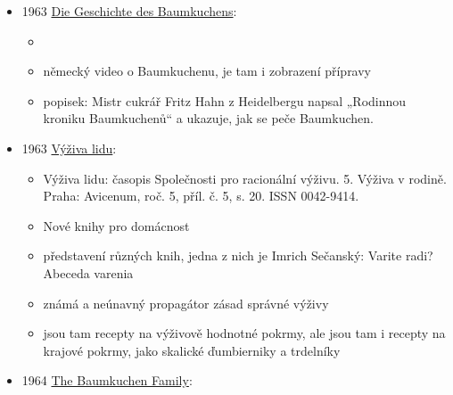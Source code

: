\begin{itemize}
  \begin{itemize}
  \tightlist
  \item
    není online, mají v
    \href{https://www.knihovny.cz/Record/nkp.SLK01-000511327?sid=30934569}{NK}
  \item
    s. 191:

    \begin{itemize}
    \tightlist
    \item
      jen zmínka, že v bohatých selských rodinách připravovala matka pro
      děti cukroví, například trdelníky s anýzem, opékané na ohništi
    \end{itemize}
  \item
    s. 192:

    \begin{itemize}
    \tightlist
    \item
      připrava trdelníků je známá jen na západě Drahanský vysočiny
    \end{itemize}
  \end{itemize}
\item
  1963
  \href{https://www.ardmediathek.de/video/swr-retro-abendschau/die-geschichte-des-baumkuchens/swr/Y3JpZDovL3N3ci5kZS9hZXgvbzExNzY4MDA}{Die
  Geschichte des Baumkuchens}:

  \begin{itemize}
  \tightlist
  \item
  \item
    německý video o Baumkuchenu, je tam i zobrazení přípravy
  \item
    popisek: Mistr cukrář Fritz Hahn z Heidelbergu napsal „Rodinnou
    kroniku Baumkuchenů`` a ukazuje, jak se peče Baumkuchen.
  \end{itemize}
\item
  1963
  \href{https://ceskadigitalniknihovna.cz/uuid/uuid:ef7b0f21-c9bf-11ee-8a98-005056825209}{Výživa
  lidu}:

  \begin{itemize}
  \tightlist
  \item
    Výživa lidu: časopis Společnosti pro racionální výživu. 5. Výživa v
    rodině. Praha: Avicenum, roč. 5, příl. č. 5, s. 20. ISSN 0042-9414.
  \item
    Nové knihy pro domácnost
  \item
    představení různých knih, jedna z nich je Imrich Sečanský: Varite
    radi? Abeceda varenia
  \item
    známá a neúnavný propagátor zásad správné výživy
  \item
    jsou tam recepty na výživově hodnotné pokrmy, ale jsou tam i recepty
    na krajové pokrmy, jako skalické ďumbierniky a trdelníky
  \end{itemize}
\item
  1964 \href{https://cakes.institute/hahn64.html}{The Baumkuchen
  Family}:


\end{itemize}
